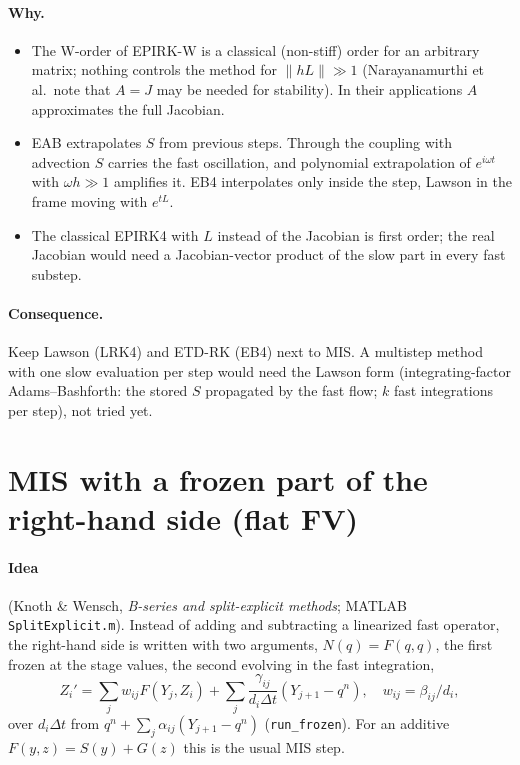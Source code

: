 \documentclass[11pt,a4paper]{article}
\newcommand{\code}[1]{\texttt{#1}}
\newcommand{\dt}{\Delta t}
\begin{document}
\paragraph{Why.}
\begin{itemize}
\item The W-order of EPIRK-W is a classical (non-stiff) order for an arbitrary matrix; nothing
  controls the method for $\|hL\|\gg1$ (Narayanamurthi et al.\ note that $A=J$ may be needed for
  stability). In their applications $A$ approximates the full Jacobian.
\item EAB extrapolates $S$ from previous steps. Through the coupling with advection $S$ carries the
  fast oscillation, and polynomial extrapolation of $e^{i\omega t}$ with $\omega h\gg1$ amplifies it.
  EB4 interpolates only inside the step, Lawson in the frame moving with $e^{tL}$.
\item The classical EPIRK4 with $L$ instead of the Jacobian is first order; the real Jacobian would
  need a Jacobian-vector product of the slow part in every fast substep.
\end{itemize}
\paragraph{Consequence.} Keep Lawson (LRK4) and ETD-RK (EB4) next to MIS. A multistep method with
one slow evaluation per step would need the Lawson form (integrating-factor Adams--Bashforth: the
stored $S$ propagated by the fast flow; $k$ fast integrations per step), not tried yet.

\section{MIS with a frozen part of the right-hand side (flat FV)}\label{sec:frozen}

\paragraph{Idea} (Knoth \& Wensch, \emph{B-series and split-explicit methods}; MATLAB \code{SplitExplicit.m}).
Instead of adding and subtracting a linearized fast operator, the right-hand side is written with
two arguments, $N(q)=F(q,q)$, the first frozen at the stage values, the second evolving in the fast
integration,
\[ Z_i' = \sum_j w_{ij}F(Y_j,Z_i) + \sum_j\frac{\gamma_{ij}}{d_i\dt}(Y_{j+1}-q^n),\quad w_{ij}=\beta_{ij}/d_i, \]
over $d_i\dt$ from $q^n+\sum_j\alpha_{ij}(Y_{j+1}-q^n)$ (\code{run\_frozen}). For an additive
$F(y,z)=S(y)+G(z)$ this is the usual MIS step.
\end{document}
